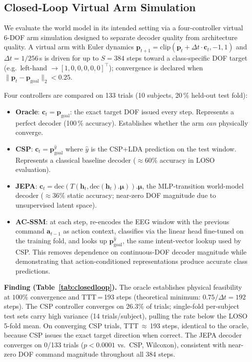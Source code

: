 \documentclass[journal]{IEEEtran}
\begin{document}
\subsection{Closed-Loop Virtual Arm Simulation}
\label{sec:closed_loop}

We evaluate the world model in its intended setting via a four-controller virtual 6-DOF arm simulation designed to separate decoder quality from architecture quality.
A virtual arm with Euler dynamics $\mathbf{p}_{t+1} = \text{clip}(\mathbf{p}_t + \Delta t \cdot \mathbf{c}_t, -1, 1)$ and $\Delta t = 1/256$\,s is driven for up to $S=384$ steps toward a class-specific DOF target (e.g.\ left-hand $\to [1,0,0,0,0,0]^\top$); convergence is declared when $\|\mathbf{p}_t - \mathbf{p}_\text{goal}\|_2 < 0.25$.

Four controllers are compared on 133 trials (10 subjects, 20\,\% held-out test fold):
\begin{itemize}
  \item \textbf{Oracle}: $\mathbf{c}_t = \mathbf{p}_\text{goal}$: the exact target DOF issued every step. Represents a perfect decoder (100\,\% accuracy). Establishes whether the arm \emph{can} physically converge.
  \item \textbf{CSP}: $\mathbf{c}_t = \mathbf{p}_\text{goal}^{\hat{y}}$ where $\hat{y}$ is the CSP+LDA prediction on the test window. Represents a classical baseline decoder ($\approx\!60\%$ accuracy in LOSO evaluation).
  \item \textbf{JEPA}: $\mathbf{c}_t = \text{dec}(T(\mathbf{h}_t, \text{dec}(\mathbf{h}_t).\bm\mu)).\bm\mu$, the MLP-transition world-model decoder ($\approx\!36\%$ static accuracy; near-zero DOF magnitude due to unsupervised latent space).
  \item \textbf{AC-SSM}: at each step, re-encodes the EEG window with the previous command $\mathbf{a}_{t-1}$ as action context, classifies via the linear head fine-tuned on the training fold, and looks up $\mathbf{p}_\text{goal}^{\hat{y}}$, the same intent-vector lookup used by CSP. This removes dependence on continuous-DOF decoder magnitude while demonstrating that action-conditioned representations produce accurate class predictions.
\end{itemize}

\textbf{Finding (Table~\ref{tab:closedloop}).}
The oracle establishes physical feasibility at $100\%$ convergence and TTT\,=\,193 steps (theoretical minimum: $0.75/\Delta t = 192$ steps).
The CSP controller converges on $26.3\%$ of trials; single-fold per-subject test sets carry high variance (14 trials/subject), pulling the rate below the LOSO 5-fold mean.
On converging CSP trials, TTT\,$\approx$\,193 steps, identical to the oracle, because CSP issues the exact target direction when correct.
The JEPA decoder converges on 0/133 trials ($p{<}0.0001$ vs.\ CSP, Wilcoxon), consistent with near-zero DOF command magnitude throughout all 384 steps.
\end{document}
